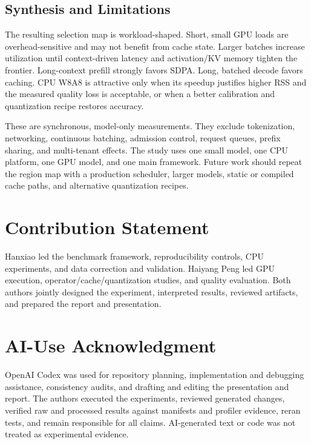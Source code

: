 \documentclass[conference]{IEEEtran}
\begin{document}
\subsection{Synthesis and Limitations}

The resulting selection map is workload-shaped. Short, small GPU loads are
overhead-sensitive and may not benefit from cache state. Larger batches
increase utilization until context-driven latency and activation/KV memory
tighten the frontier. Long-context prefill strongly favors SDPA. Long,
batched decode favors caching. CPU W8A8 is attractive only when its speedup
justifies higher RSS and the measured quality loss is acceptable, or when a
better calibration and quantization recipe restores accuracy.

These are synchronous, model-only measurements. They exclude tokenization,
networking, continuous batching, admission control, request queues, prefix
sharing, and multi-tenant effects. The study uses one small model, one CPU
platform, one GPU model, and one main framework. Future work should repeat
the region map with a production scheduler, larger models, static or compiled
cache paths, and alternative quantization recipes.

\newpage
\section{Contribution Statement}

Hanxiao led the benchmark framework, reproducibility controls, CPU
experiments, and data correction and validation. Haiyang Peng led GPU
execution, operator/cache/quantization studies, and quality evaluation. Both
authors jointly designed the experiment, interpreted results, reviewed
artifacts, and prepared the report and presentation.

\section{AI-Use Acknowledgment}

OpenAI Codex was used for repository planning, implementation and debugging
assistance, consistency audits, and drafting and editing the presentation and
report. The authors executed the experiments, reviewed generated changes,
verified raw and processed results against manifests and profiler evidence,
reran tests, and remain responsible for all claims. AI-generated text or code
was not treated as experimental evidence.



\end{document}
